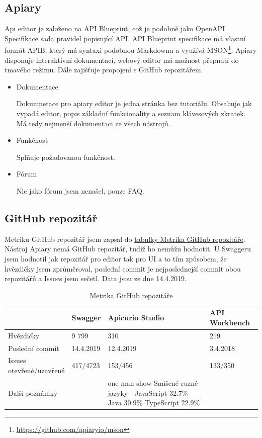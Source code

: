 \documentclass[thesis=B,czech]{FITthesis}[2012/06/26]
\begin{document}
        \subsection{Apiary}
            Api editor je založeno na API Blueprint, což je podobně jako OpenAPI Specifikace sada pravidel popisující API. API Blueprint specifikace má vlastní formát APIB, který má syntaxi podobnou Markdownu a využívá MSON\footnote{\url{https://github.com/apiaryio/mson}}.
            Apiary disponuje interaktivní dokumentací, webový editor má možnost přepnutí do tmavého režimu. Dále zajišťuje propojení s GitHub repozitářem.
            \begin{itemize}
                \item Dokumentace
                
                    Dokumnetace pro apiary editor je jedna stránka bez tutoriálu. Obsahuje jak vypadá editor, popis základní funkcionality a seznam klávesových zkratek. Má tedy nejmenší dokumentaci ze všech nástrojů.
                \item Funkčnost
                
                    Splňuje požadovanou funkčnost.
                \item Fórum
                
                    Nic jako fórum jsem nenašel, pouze FAQ.
            \end{itemize}
            \cite{apiary}
        \subsection{GitHub repozitář}
            Metriku GitHub repozitář jsem zapsal do \hyperref[tab:tabulkaPokryti]{tabulky Metrika GitHub repozitáře}.
            Nástroj Apiary nemá GitHub repozitář, tudíž ho nemůžu hodnotit. U Swaggeru jsem hodnotil jak repozitář pro editor tak pro UI a to tím způsobem, že hvězdičky jsem zprůměroval, poslední commit je nejposlednejší commit obou repozitářů a Issues jsem sečetl. Data jsou ze dne 14.4.2019.
            \begin{table}[h!]
            	\caption{Metrika GitHub repozitáře \cite{githubSwaggerUI, githubSwaggerEditor, githubApicur, githubApiworkbench}} \label{tabulkaMatrikyGitHub}
            	\begin{tabular}{| p{3cm} | p{2cm} | p{5cm} | p{2cm} |}  \hline
            		 & Swagger & Apicurio Studio & API Workbench
            		\tabularnewline \hline \hline
                    Hvězdičky & 9 799 & 310 & 219
                	\tabularnewline \hline
                    Poslední commit & 14.4.2019 & 12.4.2019 & 3.4.2018
                	\tabularnewline \hline
                    \parbox[t]{3cm}{Issues \\otevřené/uzavřené} & 417/4723 & 153/456 & 133/350
                	\tabularnewline \hline
                    Další poznámky & & one man show
                    Smíšené ruzné jazyky - JavaScript 32.7\% Java 30.9\% TypeScript 22.9\% &
                	\tabularnewline \hline
                \end{tabular}
            \end{table}
\end{document}
